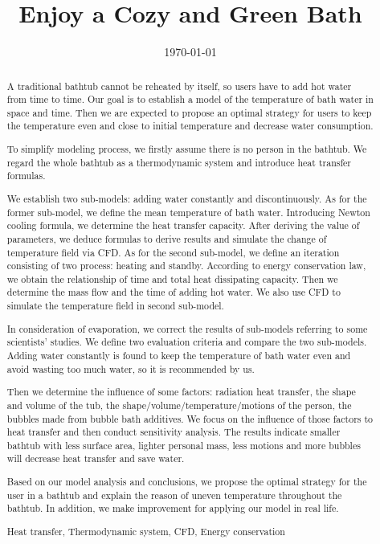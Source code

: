 \documentclass{mcmthesis}
\title{Enjoy a Cozy and Green Bath}
\date{\today}
\begin{document}
\begin{abstract}

A traditional bathtub cannot be reheated by itself, so users have to add hot water from time to time. Our goal is to establish a model of the temperature of bath water in space and time. Then we are expected to propose an optimal strategy for users to keep the temperature even and close to initial temperature and decrease water consumption.

To simplify modeling process, we firstly assume there is no person in the bathtub. We regard the whole bathtub as a thermodynamic system and introduce heat transfer formulas.

We establish two sub-models: adding water constantly and discontinuously. As for the former sub-model, we define the mean temperature of bath water. Introducing Newton cooling formula, we determine the heat transfer capacity. After deriving the value of parameters, we deduce formulas to derive results and simulate the change of temperature field via CFD. As for the second sub-model, we define an iteration consisting of two process: heating and standby. According to energy conservation law, we obtain the relationship of time and total heat dissipating capacity. Then we determine the mass flow and the time of adding hot water. We also use CFD to simulate the temperature field in second sub-model.

In consideration of evaporation, we correct the results of sub-models referring to some scientists' studies. We define two evaluation criteria and compare the two sub-models. Adding water constantly is found to keep the temperature of bath water even and avoid wasting too much water, so it is recommended by us.

Then we determine the influence of some factors: radiation heat transfer, the shape and volume of the tub, the shape/volume/temperature/motions of the person, the bubbles made from bubble bath additives. We focus on the influence of those factors to heat transfer and then conduct sensitivity analysis. The results indicate smaller bathtub with less surface area, lighter personal mass, less motions and more bubbles will decrease heat transfer and save water.

Based on our model analysis and conclusions, we propose the optimal strategy for the user in a bathtub and explain the reason of uneven temperature throughout the bathtub. In addition, we make improvement for applying our model in real life.

\begin{keywords}
Heat transfer, Thermodynamic system, CFD, Energy conservation
\end{keywords}

\end{abstract}
\end{document}
